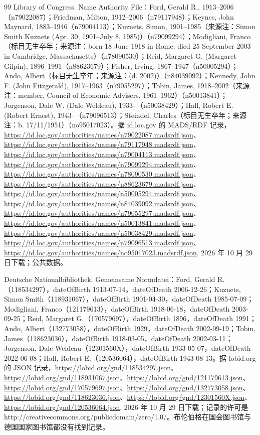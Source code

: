 \begin{thebibliography}{99}
 Library of Congress. Name Authority File：Ford, Gerald R., 1913--2006（n79022087）；Friedman, Milton, 1912--2006（n79117948）；Keynes, John Maynard, 1883--1946（n79004113）；Kuznets, Simon, 1901--1985（来源注：Simon Smith Kuznets (Apr. 30, 1901--July 8, 1985)）（n79099294）；Modigliani, Franco（标目无生卒年；来源注：born 18 June 1918 in Rome; died 25 September 2003 in Cambridge, Massachusetts）（n78090530）；Reid, Margaret G. (Margaret Gilpin), 1896--1991（n88623679）；Fisher, Irving, 1867--1947（n50005294）；Ando, Albert（标目无生卒年；来源注：(d. 2002)）（n84039092）；Kennedy, John F. (John Fitzgerald), 1917--1963（n79055297）；Tobin, James, 1918--2002（来源注：member, Council of Economic Advisers, 1961--1962）（n50013841）；Jorgenson, Dale W. (Dale Weldeau), 1933--（n50038429）；Hall, Robert E. (Robert Ernest), 1943--（n79096513）；Steindel, Charles（标目无生卒年；来源注：b. 17/11/1951）（no95017023）。据 id.loc.gov 的 MADS/RDF 记录，\url{https://id.loc.gov/authorities/names/n79022087.madsrdf.json}、\url{https://id.loc.gov/authorities/names/n79117948.madsrdf.json}、\url{https://id.loc.gov/authorities/names/n79004113.madsrdf.json}、\url{https://id.loc.gov/authorities/names/n79099294.madsrdf.json}、\url{https://id.loc.gov/authorities/names/n78090530.madsrdf.json}、\url{https://id.loc.gov/authorities/names/n88623679.madsrdf.json}、\url{https://id.loc.gov/authorities/names/n50005294.madsrdf.json}、\url{https://id.loc.gov/authorities/names/n84039092.madsrdf.json}、\url{https://id.loc.gov/authorities/names/n79055297.madsrdf.json}、\url{https://id.loc.gov/authorities/names/n50013841.madsrdf.json}、\url{https://id.loc.gov/authorities/names/n50038429.madsrdf.json}、\url{https://id.loc.gov/authorities/names/n79096513.madsrdf.json}、\url{https://id.loc.gov/authorities/names/no95017023.madsrdf.json}. 2026 年 10 月 29 日下载；公共数据。

 Deutsche Nationalbibliothek. Gemeinsame Normdatei：Ford, Gerald R.（118534297），dateOfBirth 1913-07-14，dateOfDeath 2006-12-26；Kuznets, Simon Smith（118931067），dateOfBirth 1901-04-30，dateOfDeath 1985-07-09；Modigliani, Franco（121179613），dateOfBirth 1918-06-18，dateOfDeath 2003-09-25；Reid, Margaret G.（170579697），dateOfBirth 1896，dateOfDeath 1991；Ando, Albert（132773058），dateOfBirth 1929，dateOfDeath 2002-09-19；Tobin, James（118623036），dateOfBirth 1918-03-05，dateOfDeath 2002-03-11；Jorgenson, Dale Weldeau（12301560X），dateOfBirth 1933-05-07，dateOfDeath 2022-06-08；Hall, Robert E.（120536064），dateOfBirth 1943-08-13。据 lobid.org 的 JSON 记录，\url{https://lobid.org/gnd/118534297.json}、\url{https://lobid.org/gnd/118931067.json}、\url{https://lobid.org/gnd/121179613.json}、\url{https://lobid.org/gnd/170579697.json}、\url{https://lobid.org/gnd/132773058.json}、\url{https://lobid.org/gnd/118623036.json}、\url{https://lobid.org/gnd/12301560X.json}、\url{https://lobid.org/gnd/120536064.json}. 2026 年 10 月 29 日下载；记录的许可是 http://creativecommons.org/publicdomain/zero/1.0/。布伦伯格在国会图书馆与德国国家图书馆都没有找到记录。


\end{thebibliography}
